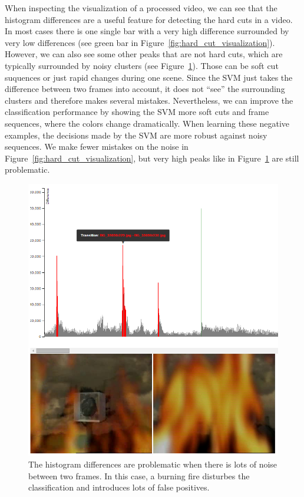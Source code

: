 When inspecting the visualization of a processed video, we can see that the histogram differences are a useful feature for detecting the hard cuts in a video.
In most cases there is one single bar with a very high difference surrounded by very low differences (see green bar in Figure~\ref{fig:hard_cut_visualization}).
However, we can also see some other peaks that are not hard cuts, which are typically surrounded by noisy clusters (see Figure~\ref{fig:hard_cut_noise_visualization}).
Those can be soft cut suquences or just rapid changes during one scene.
Since the SVM just takes the difference between two frames into account, it does not ``see'' the surrounding clusters and therefore makes several mistakes.
Nevertheless, we can improve the classification performance by showing the SVM more soft cuts and frame sequences, where the colors change dramatically.
When learning these negative examples, the decisions made by the SVM are more robust against noisy sequences.
We make fewer mistakes on the noise in Figure~\ref{fig:hard_cut_visualization}, but very high peaks like in Figure~\ref{fig:hard_cut_noise_visualization} are still problematic.

\begin{figure}
	\centering
	\includegraphics[scale=.7]{images/hard_cut_noise_visualization.png}
	\caption{The histogram differences are problematic when there is lots of noise between two frames. In this case, a burning fire disturbes the classification and introduces lots of false positives.}
	\label{fig:hard_cut_noise_visualization}
\end{figure}
